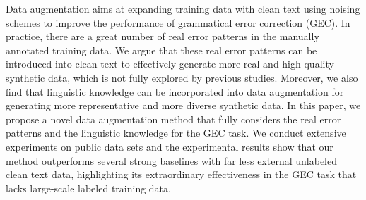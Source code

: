 Data augmentation aims at expanding training data with clean text using noising schemes to improve the performance of grammatical error correction (GEC). In practice, there are a great number of real error patterns in the manually annotated training data. We argue that these real error patterns can be introduced into clean text to effectively generate more real and high quality synthetic data, which is not fully explored by previous studies. Moreover, we also find that linguistic knowledge can be incorporated into data augmentation for generating more representative and more diverse synthetic data. In this paper, we propose a novel data augmentation method that fully considers the real error patterns and the linguistic knowledge for the GEC task. We conduct extensive experiments on public data sets and the experimental results show that our method outperforms several strong baselines with far less external unlabeled clean text data, highlighting its extraordinary effectiveness in the GEC task that lacks large-scale labeled training data.
